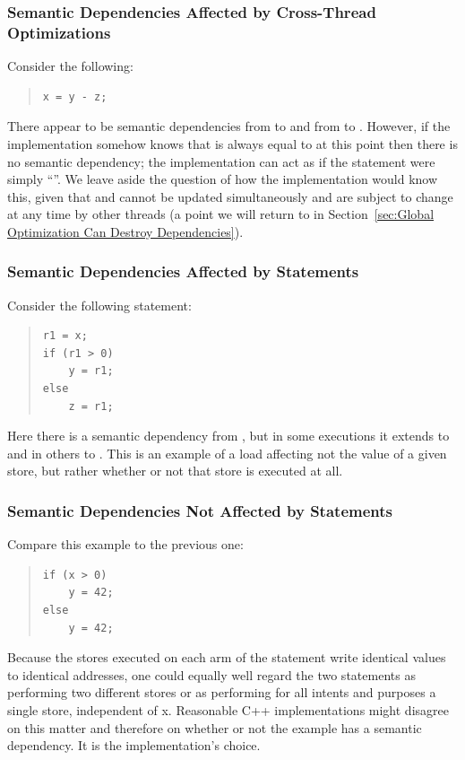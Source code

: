 \documentclass[10]{article}
\begin{document}
\subsubsection{Semantic Dependencies Affected by Cross-Thread Optimizations}
\label{sec:Semantic Dependencies Affected by Cross-Thread Optimizations}

Consider the following:
\begin{quote}
\begin{verbatim}
x = y - z;
\end{verbatim}
\end{quote}
There appear to be semantic dependencies from  to  and from 
to .
However, if the implementation somehow knows that  is
always equal to  at this point then there is no semantic dependency;
the implementation can act as if the statement were simply ``''.
We leave aside the question of how the implementation would know this,
given that  and  cannot be updated simultaneously
and are subject to change at any time by
other threads (a point we will return to in
Section~\ref{sec:Global Optimization Can Destroy Dependencies}).

\subsubsection{Semantic Dependencies Affected by  Statements}
\label{sec:Semantic Dependencies Affected by if Statements}

Consider the following  statement:
\begin{quote}
\begin{verbatim}
r1 = x;
if (r1 > 0)
    y = r1;
else
    z = r1;
\end{verbatim}
\end{quote}
Here there is a semantic dependency from , but in some executions
it extends to  and in others to .
This is an example of a load affecting not the value of
a given store, but rather whether or not that store is executed at all.

\subsubsection{Semantic Dependencies Not Affected by  Statements}
\label{sec:Semantic Dependencies Not Affected by if Statements}

Compare this example to the previous one:
\begin{quote}
\begin{verbatim}
if (x > 0)
    y = 42;
else
    y = 42;
\end{verbatim}
\end{quote}
Because the stores executed on each arm of the  statement write
identical values to identical addresses, one could equally well regard
the two statements as performing two different stores or as performing
for all intents and purposes a single store, independent of x.
Reasonable C++ implementations might disagree on this matter and
therefore on whether or not the example has a semantic dependency.
It is the implementation's choice.
\end{document}
